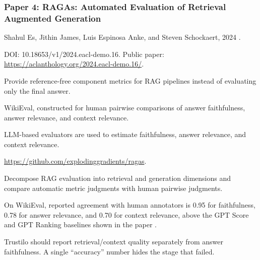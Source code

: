 \documentclass[11pt,journal,onecolumn]{IEEEtran}
\begin{document}
\subsubsection{Paper 4: RAGAs: Automated Evaluation of Retrieval Augmented Generation}
\begin{description}[leftmargin=3.25cm,style=nextline]
\item[Authors / Year] Shahul Es, Jithin James, Luis Espinosa Anke, and Steven Schockaert, 2024 \cite{es2024ragas}.
\item[DOI / Link] DOI: 10.18653/v1/2024.eacl-demo.16. Public paper: \url{https://aclanthology.org/2024.eacl-demo.16/}.
\item[Main idea] Provide reference-free component metrics for RAG pipelines instead of evaluating only the final answer.
\item[Datasets] WikiEval, constructed for human pairwise comparisons of answer faithfulness, answer relevance, and context relevance.
\item[Models] LLM-based evaluators are used to estimate faithfulness, answer relevance, and context relevance.
\item[Code] \url{https://github.com/explodinggradients/ragas}.
\item[Procedure / tricks] Decompose RAG evaluation into retrieval and generation dimensions and compare automatic metric judgments with human pairwise judgments.
\item[Metrics / results] On WikiEval, reported agreement with human annotators is 0.95 for faithfulness, 0.78 for answer relevance, and 0.70 for context relevance, above the GPT Score and GPT Ranking baselines shown in the paper \cite{es2024ragas}.
\item[Key learning] Trustilo should report retrieval/context quality separately from answer faithfulness. A single ``accuracy'' number hides the stage that failed.
\end{description}
\end{document}
